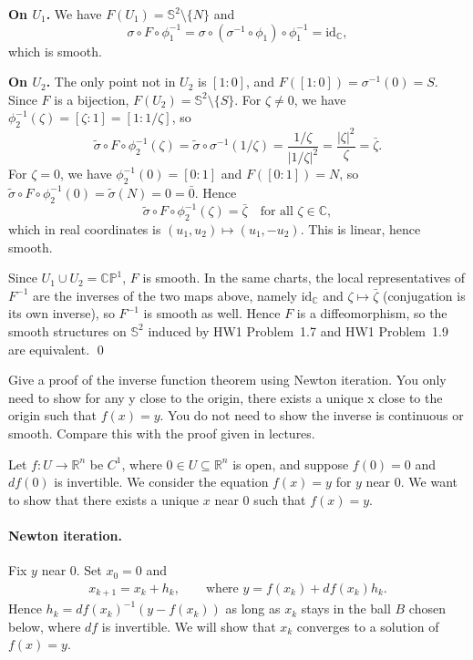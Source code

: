 \textbf{On $U_1$.} We have $F(U_1)=\mathbb{S}^2\setminus\{N\}$ and
\begin{equation}
    \sigma\circ F\circ\phi_1^{-1}=\sigma\circ(\sigma^{-1}\circ\phi_1)\circ\phi_1^{-1}=\mathrm{id}_{\mathbb{C}},
\end{equation}
which is smooth.

\textbf{On $U_2$.} The only point not in $U_2$ is $[1:0]$, and $F([1:0])=\sigma^{-1}(0)=S$. Since $F$ is a bijection, $F(U_2)=\mathbb{S}^2\setminus\{S\}$. For $\zeta\neq 0$, we have $\phi_2^{-1}(\zeta)=[\zeta:1]=[1:1/\zeta]$, so
\begin{equation}
    \tilde\sigma\circ F\circ\phi_2^{-1}(\zeta)=\tilde\sigma\circ\sigma^{-1}(1/\zeta)=\frac{1/\zeta}{|1/\zeta|^2}=\frac{|\zeta|^2}{\zeta}=\bar\zeta.
\end{equation}
For $\zeta=0$, we have $\phi_2^{-1}(0)=[0:1]$ and $F([0:1])=N$, so $\tilde\sigma\circ F\circ\phi_2^{-1}(0)=\tilde\sigma(N)=0=\bar 0$. Hence
\begin{equation}
    \tilde\sigma\circ F\circ\phi_2^{-1}(\zeta)=\bar\zeta\quad\text{for all }\zeta\in\mathbb{C},
\end{equation}
which in real coordinates is $(u_1,u_2)\mapsto(u_1,-u_2)$. This is linear, hence smooth.

Since $U_1\cup U_2=\mathbb{CP}^1$, $F$ is smooth. In the same charts, the local representatives of $F^{-1}$ are the inverses of the two maps above, namely $\mathrm{id}_{\mathbb{C}}$ and $\zeta\mapsto\bar\zeta$ (conjugation is its own inverse), so $F^{-1}$ is smooth as well. Hence $F$ is a diffeomorphism, so the smooth structures on $\mathbb{S}^2$ induced by HW1 Problem~1.7 and HW1 Problem~1.9 are equivalent. \qed





\clearpage
{}
Give a proof of the inverse function theorem using Newton iteration. You only need to show for any y close to the origin, there exists a unique x close to the origin such that $f(x)=y$. You do not need to show the inverse is continuous or smooth. Compare this with the proof given in lectures. 
\answer{}




Let $f:U\to\mathbb{R}^n$ be $C^1$, where $0\in U\subseteq\mathbb{R}^n$ is open, and suppose $f(0)=0$ and $df(0)$ is invertible. We consider the equation $f(x)=y$ for $y$ near $0$. We want to show that there exists a unique $x$ near $0$ such that $f(x)=y$. 

\paragraph{Newton iteration.} Fix $y$ near $0$. Set $x_0=0$ and
\begin{align}
    x_{k+1}=x_k+h_k,\qquad\text{where } y=f(x_k)+df(x_k)h_k.
\end{align}
Hence $h_k=df(x_k)^{-1}(y-f(x_k))$ as long as $x_k$ stays in the ball $B$ chosen below, where $df$ is invertible. We will show that $x_k$ converges to a solution of $f(x)=y$.

